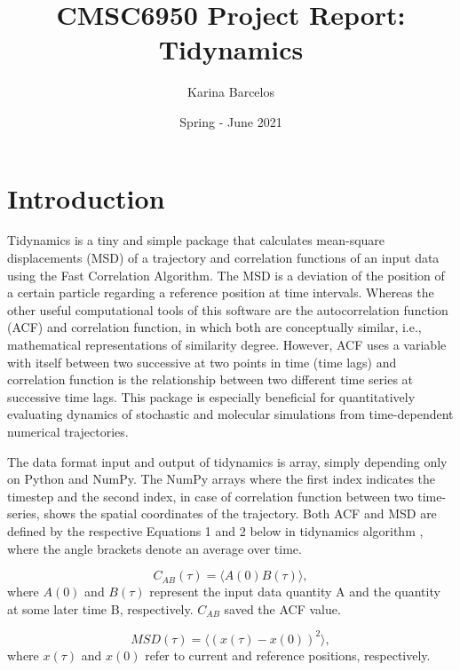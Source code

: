 \documentclass{article}
\title{CMSC6950 Project Report: Tidynamics}
\author{Karina Barcelos}
\date{Spring - June 2021}
\begin{document}
\maketitle

\section{Introduction}

Tidynamics \cite{Buyl2018} is a tiny and simple package that calculates mean-square displacements (MSD) of a trajectory and correlation functions of an input data using the Fast Correlation Algorithm. \cite{kneller1995nmoldyn} The MSD is a deviation of the position of a certain particle regarding a reference position at time intervals. Whereas the other useful computational tools of this software are the autocorrelation function (ACF) and correlation function, in which both are conceptually similar, i.e., mathematical representations of similarity degree. However, ACF uses a variable with itself between two successive at two points in time (time lags) and correlation function is the relationship between two different time series at successive time lags. This package is especially beneficial for quantitatively evaluating dynamics of stochastic and molecular simulations from time-dependent numerical trajectories.
 
The data format input and output of tidynamics \cite{Buyl2018} is array, simply depending only on Python and NumPy. The NumPy arrays where the first index indicates the timestep and the second index, in case of correlation function between two time-series, shows the spatial coordinates of the trajectory. Both ACF and MSD are defined by the respective Equations 1 and 2 below in tidynamics algorithm \cite{Buyl2018}, where the angle brackets denote an average over time. \cite{kneller1995nmoldyn}

\begin{equation}
C_{AB}(\tau) = \langle A(0) B(\tau) \rangle,
\label{eqn:correlation}
\end{equation}
where  $A(0)$ and $B(\tau)$ represent the input data quantity A and the quantity at some later time B, respectively. $C_{AB}$ saved the ACF value.

\begin{equation}
MSD(\tau) = \langle (x(\tau) - x(0) )^2 \rangle,
\label{eqn:msd}
\end{equation}
where $x(\tau)$ and $x(0)$ refer to current and reference positions, respectively.
\end{document}
